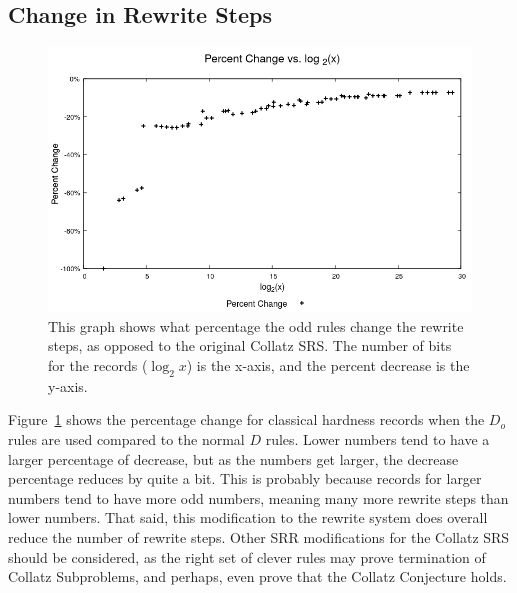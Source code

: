 \subsection{Change in Rewrite Steps}
\begin{figure}
    \centering
    \includegraphics[scale=0.75]{ModAvoidanceAnalysisPics/Percent_Change.png}
    \caption{This graph shows what percentage the odd rules change the rewrite steps, as opposed to the original Collatz SRS. The number of bits for the records ($\log_2{x}$) is the x-axis, and the percent decrease is the y-axis.}
    \label{fig:percent_decrease}
\end{figure}
Figure~\ref{fig:percent_decrease} shows the percentage change for classical hardness records when the $D_o$ rules are used compared to the normal $D$ rules. Lower numbers tend to have a larger percentage of decrease, but as the numbers get larger, the decrease percentage reduces by quite a bit. This is probably because records for larger numbers tend to have more odd numbers, meaning many more rewrite steps than lower numbers. That said, this modification to the rewrite system does overall reduce the number of rewrite steps. Other SRR modifications for the Collatz SRS should be considered, as the right set of clever rules may prove termination of Collatz Subproblems, and perhaps, even prove that the Collatz Conjecture holds.
